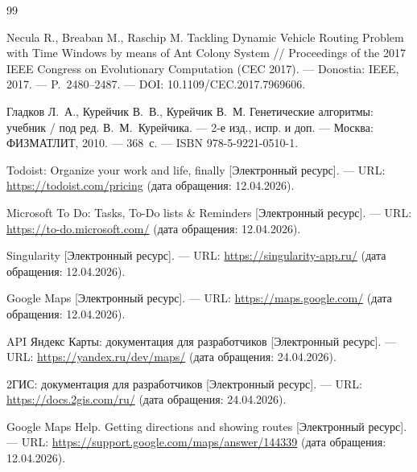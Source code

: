 \begin{thebibliography}{99}
      

      Necula R., Breaban M., Raschip M.
      Tackling Dynamic Vehicle Routing Problem with Time Windows
      by means of Ant Colony System //
      Proceedings of the 2017 IEEE Congress on Evolutionary Computation
      (CEC 2017). ---
      Donostia: IEEE, 2017. --- P.~2480--2487. ---
      DOI: 10.1109/CEC.2017.7969606.

      

      Гладков Л.~А., Курейчик В.~В., Курейчик В.~М.
      Генетические алгоритмы: учебник / под ред. В.~М.~Курейчика. ---
      2-е изд., испр. и доп. ---
      Москва: ФИЗМАТЛИТ, 2010. --- 368~с. ---
      ISBN 978-5-9221-0510-1.

      

      Todoist: Organize your work and life, finally [Электронный ресурс]. ---
      URL: \url{https://todoist.com/pricing} (дата обращения: 12.04.2026).

      

      Microsoft To Do: Tasks, To-Do lists \& Reminders [Электронный ресурс]. ---
      URL: \url{https://to-do.microsoft.com/} (дата обращения: 12.04.2026).

      

      Singularity [Электронный ресурс]. ---
      URL: \url{https://singularity-app.ru/} (дата обращения: 12.04.2026).

      

      Google Maps [Электронный ресурс]. ---
      URL: \url{https://maps.google.com/} (дата обращения: 12.04.2026).

      

      API Яндекс Карты: документация для разработчиков
      [Электронный ресурс]. ---
      URL: \url{https://yandex.ru/dev/maps/} (дата обращения: 24.04.2026).

      

      2ГИС: документация для разработчиков [Электронный ресурс]. ---
      URL: \url{https://docs.2gis.com/ru/} (дата обращения: 24.04.2026).

      

      Google Maps Help. Getting directions and showing routes
      [Электронный ресурс]. ---
      URL: \url{https://support.google.com/maps/answer/144339} (дата обращения: 12.04.2026).

      


\end{thebibliography}
